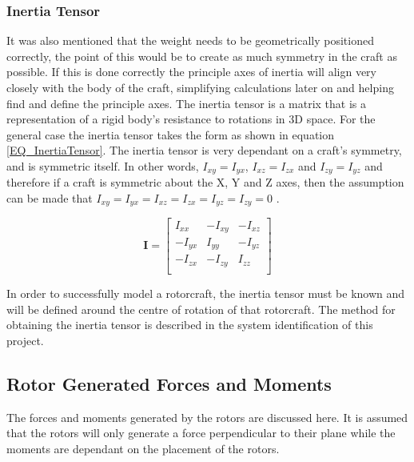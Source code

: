 		\subsubsection{Inertia Tensor}
		It was also mentioned that the weight needs to be geometrically positioned correctly, the point of this would be to create as much symmetry in the craft as possible. If this is done correctly the principle axes of inertia will align very closely with the body of the craft, simplifying calculations later on and helping find and define the principle axes. The inertia tensor is a matrix that is a representation of a rigid body's resistance to rotations in 3D space. For the general case the inertia tensor takes the form as shown in equation \eqref{EQ_InertiaTensor}. The inertia tensor is very dependant on a craft's symmetry, and is symmetric itself. In other words, $I_{xy} = I_{yx}$, $I_{xz} = I_{zx}$ and $I_{zy} = I_{yz}$ and therefore if a craft is symmetric about the X, Y and Z axes, then the assumption can be made that $I_{xy} = I_{yx} = I_{xz} = I_{zx} = I_{yz} = I_{zy} = 0$ \cite{Luukkonen, MiniFlying}.
		
		\begin{equation}
		\label{EQ_InertiaTensor}
		\textbf{I} = 
		\begin{bmatrix}
		I_{xx}	& -I_{xy} & -I_{xz}\\
		-I_{yx}	& I_{yy}	& -I_{yz}\\
		-I_{zx}	& -I_{zy}	& I_{zz}\\
		\end{bmatrix}
		\end{equation}
		
		In order to successfully model a rotorcraft, the inertia tensor must be known and will be defined around the centre of rotation of that rotorcraft. The method for obtaining the inertia tensor is described in the system identification of this project.
		
	\subsection{Rotor Generated Forces and Moments}
	The forces and moments generated by the rotors are discussed here. It is assumed that the rotors will only generate a force perpendicular to their plane while the moments are dependant on the placement of the rotors.
	
